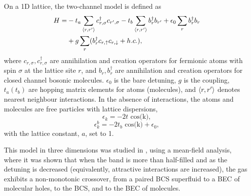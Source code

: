 \documentclass[aps,pra,
superscriptaddress,
reprint,twocolumn,preprintnumbers,
amsmath,amssymb,
nofootinbib]{revtex4-1}
\begin{document}
		On a 1D lattice, the two-channel model is defined as 
		\begin{align}
		H = & - t_a \sum_{\braket{r , r'}} c_{r,\sigma}^{\dagger} c_{r',\sigma}  - t_b \sum_{\braket{r , r'}} b_{r}^{\dagger} b_{r'} + \epsilon_0 \sum_r b_r^\dagger b_r \nonumber \\& + g \sum_r (b_r^\dagger c_{r,\uparrow} c_{r,\downarrow} + h.c.) ,
		\end{align}			
	where $c_{r,\sigma},c_{r,\sigma}^\dagger $ are annihilation and creation operators for fermionic atoms with spin $\sigma$ at the lattice site $r$, and $b_r,b_r^\dagger$ are annihilation and creation operators for closed channel bosonic molecules. $\epsilon_0$ is the bare detuning, $g$ is the coupling, $t_a (t_b)$ are hopping matrix elements for atoms (molecules), and $\braket{r,r'}$ denotes nearest neighbour interactions. In the absence of interactions, the atoms and molecules are free particles with lattice dispersions,
		\begin{equation}
		\epsilon_k = - 2 t \text{ cos(k)}  ,
		\end{equation}		 
		\begin{equation}
		\epsilon_k^b = - 2 t_b \text{ cos(k)} + \epsilon_0 ,
		\end{equation}
with the lattice constant, $a$, set to 1.

This model in three dimensions was studied in \cite{Shen2012}, using a mean-field analysis, where it was shown that when the band is more than half-filled and as the detuning is decreased (equivalently, attractive interactions are increased), the gas exhibits a non-monotonic crossover, from a paired BCS superfluid to a BEC of molecular holes, to the BCS, and to the BEC of molecules.
\end{document}
